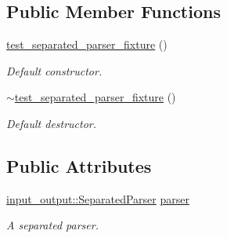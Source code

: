 \subsection*{Public Member Functions}
\begin{DoxyCompactItemize}
\item 
\hyperlink{structtudat_1_1unit__tests_1_1test__separated__parser__fixture_a3b9c7ab6be97d1101757f9c9a327eba9}{test\+\_\+separated\+\_\+parser\+\_\+fixture} ()\hypertarget{structtudat_1_1unit__tests_1_1test__separated__parser__fixture_a3b9c7ab6be97d1101757f9c9a327eba9}{}\label{structtudat_1_1unit__tests_1_1test__separated__parser__fixture_a3b9c7ab6be97d1101757f9c9a327eba9}

\begin{DoxyCompactList}\small\item\em Default constructor. \end{DoxyCompactList}\item 
\hyperlink{structtudat_1_1unit__tests_1_1test__separated__parser__fixture_a2d7c23ae769484f5b4cb093df33765af}{$\sim$test\+\_\+separated\+\_\+parser\+\_\+fixture} ()\hypertarget{structtudat_1_1unit__tests_1_1test__separated__parser__fixture_a2d7c23ae769484f5b4cb093df33765af}{}\label{structtudat_1_1unit__tests_1_1test__separated__parser__fixture_a2d7c23ae769484f5b4cb093df33765af}

\begin{DoxyCompactList}\small\item\em Default destructor. \end{DoxyCompactList}\end{DoxyCompactItemize}
\subsection*{Public Attributes}
\begin{DoxyCompactItemize}
\item 
\hyperlink{classtudat_1_1input__output_1_1SeparatedParser}{input\+\_\+output\+::\+Separated\+Parser} \hyperlink{structtudat_1_1unit__tests_1_1test__separated__parser__fixture_a7dace07c3f7ff52941bb5efccabfcff5}{parser}\hypertarget{structtudat_1_1unit__tests_1_1test__separated__parser__fixture_a7dace07c3f7ff52941bb5efccabfcff5}{}\label{structtudat_1_1unit__tests_1_1test__separated__parser__fixture_a7dace07c3f7ff52941bb5efccabfcff5}

\begin{DoxyCompactList}\small\item\em A separated parser. \end{DoxyCompactList}\end{DoxyCompactItemize}


